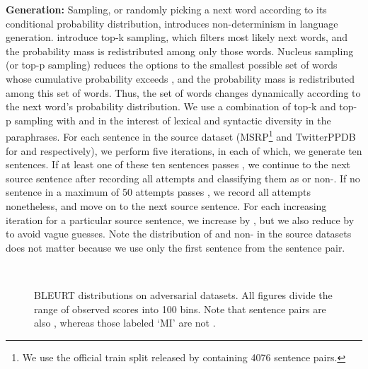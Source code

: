 \noindent \textbf{Generation:} Sampling, or randomly picking a next word according to its conditional probability distribution, introduces non-determinism in language generation. \citet{fan2018hierarchical} introduce top-k sampling, which filters  most likely next words, and the probability mass is redistributed among only those  words. Nucleus sampling (or top-p sampling) \cite{holtzman2020curious} reduces the options to the smallest possible set of words whose cumulative probability exceeds , and the probability mass is redistributed among this set of words. Thus, the set of words changes dynamically according to the next word's probability distribution. We use a combination of top-k and top-p sampling with  and  in the interest of lexical and syntactic diversity in the paraphrases. For each sentence in the source dataset (MSRP\footnote{We use the official train split released by \citet{dolan2005automatically} containing 4076 sentence pairs.} and TwitterPPDB for  and  respectively), we perform five iterations, in each of which, we generate ten sentences. If at least one of these ten sentences passes , we continue to the next source sentence after recording all attempts and classifying them as  or non-. If no sentence in a maximum of 50 attempts passes , we record all attempts nonetheless, and move on to the next source sentence. For each increasing iteration for a particular source sentence, we increase  by , but we also reduce  by  to avoid vague guesses. Note the distribution of  and non- in the source datasets does not matter because we use only the first sentence from the sentence pair.

\begin{figure*}[t]
    \centering
    \\
    \caption{BLEURT distributions on adversarial datasets. All figures divide the range of observed scores into 100 bins. Note that  sentence pairs are also , whereas those labeled `MI' are not .}
    \label{fig:bleurt}
\end{figure*}

\vspace{-5pt}
